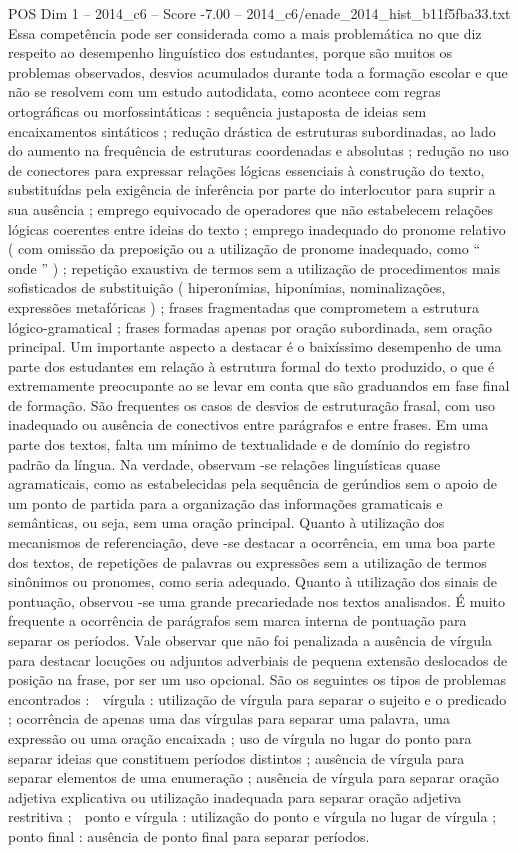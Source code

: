 \begin{textsample}{POS Dim 1 – 2014\_c6 – Score -7.00 – 2014\_c6/enade\_2014\_hist\_b11f5fba33.txt}
Essa competência pode ser considerada como a mais problemática no que diz respeito ao desempenho linguístico dos estudantes, porque são muitos os problemas observados, desvios acumulados durante toda a formação escolar e que não se resolvem com um estudo autodidata, como acontece com regras ortográficas ou morfossintáticas : sequência justaposta de ideias sem encaixamentos sintáticos ; redução drástica de estruturas subordinadas, ao lado do aumento na frequência de estruturas coordenadas e absolutas ; redução no uso de conectores para expressar relações lógicas essenciais à construção do texto, substituídas pela exigência de inferência por parte do interlocutor para suprir a sua ausência ; emprego equivocado de operadores que não estabelecem relações lógicas coerentes entre ideias do texto ; emprego inadequado do pronome relativo ( com omissão da preposição ou a utilização de pronome inadequado, como “ onde ” ) ; repetição exaustiva de termos sem a utilização de procedimentos mais sofisticados de substituição ( hiperonímias, hiponímias, nominalizações, expressões metafóricas ) ; frases fragmentadas que comprometem a estrutura lógico-gramatical ; frases formadas apenas por oração subordinada, sem oração principal.
Um importante aspecto a destacar é o baixíssimo desempenho de uma parte dos estudantes em relação à estrutura formal do texto produzido, o que é extremamente preocupante ao se levar em conta que são graduandos em fase final de formação.
São frequentes os casos de desvios de estruturação frasal, com uso inadequado ou ausência de conectivos entre parágrafos e entre frases.
Em uma parte dos textos, falta um mínimo de textualidade e de domínio do registro padrão da língua.
Na verdade, observam -se relações linguísticas quase agramaticais, como as estabelecidas pela sequência de gerúndios sem o apoio de um ponto de partida para a organização das informações gramaticais e semânticas, ou seja, sem uma oração principal.
Quanto à utilização dos mecanismos de referenciação, deve -se destacar a ocorrência, em uma boa parte dos textos, de repetições de palavras ou expressões sem a utilização de termos sinônimos ou pronomes, como seria adequado.
Quanto à utilização dos sinais de pontuação, observou -se uma grande precariedade nos textos analisados.
É muito frequente a ocorrência de parágrafos sem marca interna de pontuação para separar os períodos.
Vale observar que não foi penalizada a ausência de vírgula para destacar locuções ou adjuntos adverbiais de pequena extensão deslocados de posição na frase, por ser um uso opcional.
São os seguintes os tipos de problemas encontrados :  vírgula : utilização de vírgula para separar o sujeito e o predicado ; ocorrência de apenas uma das vírgulas para separar uma palavra, uma expressão ou uma oração encaixada ; uso de vírgula no lugar do ponto para separar ideias que constituem períodos distintos ; ausência de vírgula para separar elementos de uma enumeração ; ausência de vírgula para separar oração adjetiva explicativa ou utilização inadequada para separar oração adjetiva restritiva ;  ponto e vírgula : utilização do ponto e vírgula no lugar de vírgula ;  ponto final : ausência de ponto final para separar períodos.

\end{textsample}

